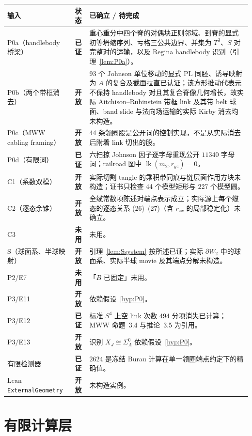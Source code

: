 \documentclass[11pt]{amsart}
\theoremstyle{definition}
\theoremstyle{remark}
\newcommand{\Open}{\textbf{开放}}
\newcommand{\Discharged}{\textbf{已证}}
\newcommand{\Unused}{\textbf{未用}}
\begin{document}
\begin{center}
\small
\begin{tabularx}{\textwidth}{@{}l l X@{}}
\toprule
输入 & 状态 & 已确立 / 待完成 \\
\midrule
P0a（handlebody 桥梁） & \Discharged & 重心重分中四个脊的对偶块正则邻域、到脊的显式初等坍缩序列、亏格三公共边界、并集为 $T^3$、$S$ 对完整对的运输，以及 Regina handlebody 识别（引理~\ref{lem:P0a}）。 \\
P0b（两个带框消去） & \Open & 93 个 Johnson 单位移动的显式 PL 同胚、诱导映射为 $A$ 的复合及截面拉直已认证；该方形推动代表元不保持 handlebody 对且其复合脊像几何增长，故实际 Aitchison--Rubinstein 带框 link 及其带 belt 球面、band slide 与法向场运输的实际 Kirby 消去均未构造。 \\
P0c（MWW cabling framing） & \Open & 44 条领圈股是公开词的控制实现，不是从实际消去后附着 link 切出的股。 \\
P0d（有限词） & \Discharged & 六扫掠 Johnson 因子逐字母重现公开 $11340$ 字母词；railroad 图中 $\operatorname{lk}(m_2,r_{yz})=0$。 \\
C1（系数双模） & \Open & 实际切割 tangle 的乘积带同痕与链层面作用方块未构造；证书只检查 44 个模型矩形与 227 个模型圆。 \\
C2（逐态余锥） & \Open & 全缆常数项陈述对端点表示成立；实际源上每个缆态的逐态关系 (26)--(27)（含 $r_{zx}$ 的局部稳定化）未确立。 \\
C3 & \Unused & 未用。 \\
S（球面系、半球映射） & \Open & 引理~\ref{lem:Ssystem} 按所述已证；实际 $\partial W_2$ 中的球面系、实际半球 movie 及其端点分解未构造。 \\
P2/E7 & \Unused & 「$B$ 已固定」未用。 \\
P3/E11 & \Open & 依赖假设~\ref{hyp:P0}。 \\
P3/E12 & \Discharged & 标准 $S^4$ 上空 link 次数 $494$ 分项消失已计算；MWW 命题~3.4 与推论~3.5 为引用。 \\
P3/E13 & \Open & 识别 $X_J\cong\Sigma_A^0$ 依赖假设~\ref{hyp:P0}。 \\
有限检测器 & \Discharged & $2624$ 是冻结 Burau 计算在单一领圈端点约定下的精确值。 \\
Lean \texttt{ExternalGeometry} & \Open & 未构造实例。 \\
\bottomrule
\end{tabularx}
\end{center}


\section{有限计算层}
\end{document}
